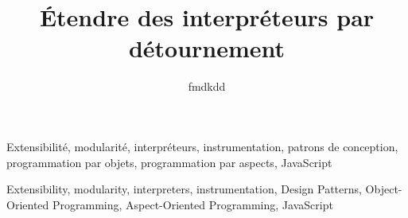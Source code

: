 

\newcommand{\titlefr}{Étendre des interpréteurs par détournement}
\newcommand{\subtitlefr}{Comment j'ai appris à ne plus m'en faire et à aimer le code}
\newcommand{\titleen}{Extending interpreters by diversion}

\title{\titlefr}
\author{fmdkdd}





\begin{resume}

\end{resume}

\begin{motscles}
Extensibilité, modularité, interpréteurs, instrumentation, patrons de
conception, programmation par objets, programmation par aspects, JavaScript
\end{motscles}

\begin{abstract_}

\end{abstract_}

\begin{keywords}
Extensibility, modularity, interpreters, instrumentation, Design Patterns,
Object-Oriented Programming, Aspect-Oriented Programming, JavaScript
\end{keywords}





\frontmatter
\pagestyle{empty}


